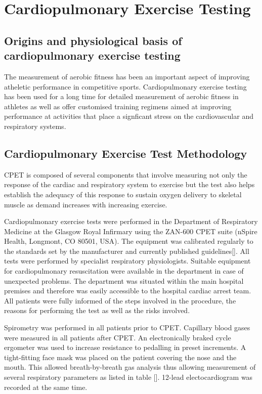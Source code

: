 \section{Cardiopulmonary Exercise Testing}

\subsection{Origins and physiological basis of cardiopulmonary exercise testing}
The measurement of aerobic fitness has been an important aspect of improving atheletic performance in competitive sports. Cardiopulmonary exercise testing has been used for a long time for detailed measurement of aerobic fitness in athletes as well as offer customised training regimens aimed at improving performance at activities that place a signficant stress on the cardiovascular and respiratory systems.


\subsection{Cardiopulmonary Exercise Test Methodology}
\label{sec:cpx_method}
CPET is composed of several components that involve measuring not only the response of the cardiac and respiratory system to exercise but the test also helps establish the adequacy of this response to sustain oxygen delivery to skeletal muscle as demand increases with increasing exercise. 

Cardiopulmonary exercise tests were performed in the Department of Respiratory Medicine at the Glasgow Royal Infirmary using the ZAN-600 CPET suite (nSpire Health, Longmont, CO 80501, USA). The equipment was calibrated regularly to the standards set by the manufacturer and currently published guidelines[]. All tests were performed by specialist respiratory physiologists. Suitable equipment for cardiopulmonary resuscitation were available in the department in case of unexpected problems. The department was situated within the main hospital premises and therefore was easily accessible to the hospital cardiac arrest team. All patients were fully informed of the steps involved in the procedure, the reasons for performing the test as well as the risks involved. 

Spirometry was performed in all patients prior to CPET. Capillary blood gases were measured in all patients after CPET. An electronically braked cycle ergometer was used to increase resistance to pedalling in preset increments. A tight-fitting face mask was placed on the patient covering the nose and the mouth. This allowed breath-by-breath gas analysis thus allowing measurement of several respiratory parameters as listed in table []. 12-lead electocardiogram was recorded at the same time. 

